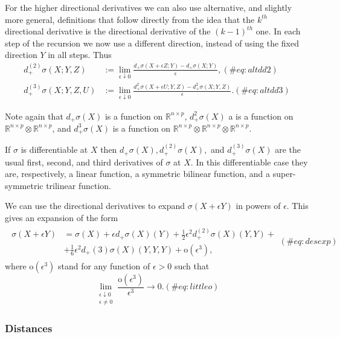 \documentclass[
  12pt,
  letterpaper,
  DIV=11,
  numbers=noendperiod]{scrreprt}
\theoremstyle{remark}
\begin{document}
For the higher directional derivatives we can also use alternative, and
slightly more general, definitions that follow directly from the idea
that the \(k^{th}\) directional derivative is the directional derivative
of the \((k-1)^{th}\) one. In each step of the recursion we now use a
different direction, instead of using the fixed direction \(Y\) in all
steps. Thus \begin{align}
d_+^{(2)}\sigma(X;Y,Z)&:=\lim_{\epsilon\downarrow 0}\frac{d_+\sigma(X+\epsilon Z;Y)-d_+\sigma(X;Y)}{\epsilon},(\#eq:altdd2)\\
d_+^{(3)}\sigma(X;Y,Z,U)&:=\lim_{\epsilon\downarrow 0}\frac{d_+^2\sigma(X+\epsilon U;Y,Z)-d_+^2\sigma(X;Y,Z)}{\epsilon}.(\#eq:altdd3)
\end{align}

Note again that \(d_+\sigma(X)\) is a function on
\(\mathbb{R}^{n\times p}\), \(d_+^2\sigma(X)\) a is a function on
\(\mathbb{R}^{n\times p}\otimes\mathbb{R}^{n\times p}\), and
\(d_+^3\sigma(X)\) is a function on
\(\mathbb{R}^{n\times p}\otimes\mathbb{R}^{n\times p}\otimes\mathbb{R}^{n\times p}\).

If \(\sigma\) is differentiable at \(X\) then
\(d_+\sigma(X), d_+^{(2)}\sigma(X),\) and \(d_+^{(3)}\sigma(X)\) are the
usual first, second, and third derivatives of \(\sigma\) at \(X\). In
this differentiable case they are, respectively, a linear function, a
symmetric bilinear function, and a super-symmetric trilinear function.

We can use the directional derivatives to expand
\(\sigma(X+\epsilon Y)\) in powers of \(\epsilon\). This gives an
expansion of the form \begin{align}
\begin{split}
\sigma(X+\epsilon Y)&=\sigma(X)+\epsilon d_+\sigma(X)(Y)+\frac12\epsilon^2d^{(2)}_+\sigma(X)(Y,Y)+\\&+\frac16\epsilon^2d_+{(3)}\sigma(X)(Y,Y,Y)+\text{o}(\epsilon^3),
\end{split}(\#eq:desexp)
\end{align} where \(\text{o}(\epsilon^3)\) stand for any function of
\(\epsilon>0\) such that \begin{equation}
\lim_{\substack{\epsilon\downarrow 0\\\epsilon\not= 0}}
\frac{\text{o}(\epsilon^3)}{\epsilon^3}\rightarrow 0.
(\#eq:littleo)
\end{equation}

\subsubsection{Distances}\label{distances}
\end{document}
